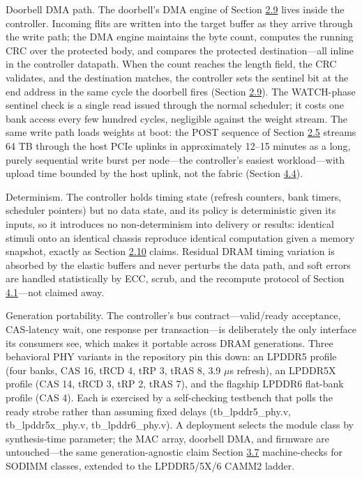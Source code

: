 \documentclass[10pt,twocolumn]{article}
\begin{document}
Doorbell DMA path. The doorbell's DMA engine of Section \hyperref[sec:2.9]{2.9} lives inside the controller. Incoming flits are written into the target buffer as they arrive through the write path; the DMA engine maintains the byte count, computes the running CRC over the protected body, and compares the protected destination---all inline in the controller datapath. When the count reaches the length field, the CRC validates, and the destination matches, the controller sets the sentinel bit at the end address in the same cycle the doorbell fires (Section \hyperref[sec:2.9]{2.9}). The WATCH-phase sentinel check is a single read issued through the normal scheduler; it costs one bank access every few hundred cycles, negligible against the weight stream. The same write path loads weights at boot: the POST sequence of Section \hyperref[sec:2.5]{2.5} streams 64 TB through the host PCIe uplinks in approximately 12--15 minutes as a long, purely sequential write burst per node---the controller's easiest workload---with upload time bounded by the host uplink, not the fabric (Section \hyperref[sec:4.4]{4.4}).

Determinism. The controller holds timing state (refresh counters, bank timers, scheduler pointers) but no data state, and its policy is deterministic given its inputs, so it introduces no non-determinism into delivery or results: identical stimuli onto an identical chassis reproduce identical computation given a memory snapshot, exactly as Section \hyperref[sec:2.10]{2.10} claims. Residual DRAM timing variation is absorbed by the elastic buffers and never perturbs the data path, and soft errors are handled statistically by ECC, scrub, and the recompute protocol of Section \hyperref[sec:4.1]{4.1}---not claimed away.

Generation portability. The controller's bus contract---valid/ready acceptance, CAS-latency wait, one response per transaction---is deliberately the only interface its consumers see, which makes it portable across DRAM generations. Three behavioral PHY variants in the repository pin this down: an LPDDR5 profile (four banks, CAS 16, tRCD 4, tRP 3, tRAS 8, 3.9 $\mu$s refresh), an LPDDR5X profile (CAS 14, tRCD 3, tRP 2, tRAS 7), and the flagship LPDDR6 flat-bank profile (CAS 4). Each is exercised by a self-checking testbench that polls the ready strobe rather than assuming fixed delays (tb\_lpddr5\_phy.v, tb\_lpddr5x\_phy.v, tb\_lpddr6\_phy.v). A deployment selects the module class by synthesis-time parameter; the MAC array, doorbell DMA, and firmware are untouched---the same generation-agnostic claim Section \hyperref[sec:3.7]{3.7} machine-checks for SODIMM classes, extended to the LPDDR5/5X/6 CAMM2 ladder.
\end{document}
